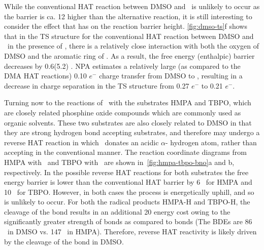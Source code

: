 While the conventional HAT reaction between DMSO and \bno\ is unlikely to occur as the barrier is ca. 12 \kcalmol higher than the alternative reaction, it is still interesting to consider the effect that  has on the reaction barrier height. \ref{fig:dmso-ts}f shows that in the TS structure for the conventional HAT reaction between DMSO and \bno\ in the presence of , there is a relatively close interaction with both the oxygen of DMSO and the aromatic ring of \bno. As a result, the free energy (enthalpic) barrier decreases by 0.6(5.2) \kcalmol. NPA estimates a relatively large (as compared to the DMA HAT reactions) 0.10 $e^-$ charge transfer from DMSO to , resulting in a decrease in charge separation in the TS structure from 0.27 $e^-$ to 0.21 $e^-$.

Turning now to the reactions of \bno\ with the substrates HMPA and TBPO, which are closely related phosphine oxide compounds which are commonly used as organic solvents. These two substrates are also closely related to DMSO in that they are strong hydrogen bond accepting substrates, and therefore may undergo a reverse HAT reaction in which \bno\ donates an acidic $\alpha$- hydrogen atom, rather than accepting in the conventional manner. The reaction coordinate diagrams from HMPA with \bno\ and TBPO with \bno\ are shown in~\ref{fig:hmpa-tbpo-bno}a and b, respectively. In the possible reverse HAT reactions for both substrates the free energy barrier is lower than the conventional HAT barrier by 6 \kcalmol\ for HMPA and 10 \kcalmol\ for TBPO. However, in both cases the process is energetically uphill, and so is unlikely to occur. For both the radical products HMPA-H and TBPO-H, the cleavage of the  bond results in an additional 20 \kcalmol energy cost owing to the significantly greater strength of  bonds as compared to  bonds (The BDEs are 86 \kcalmol\ in DMSO vs. 147 \kcalmol\ in HMPA). Therefore, reverse HAT reactivity is likely driven by the cleavage of the  bond in DMSO.

